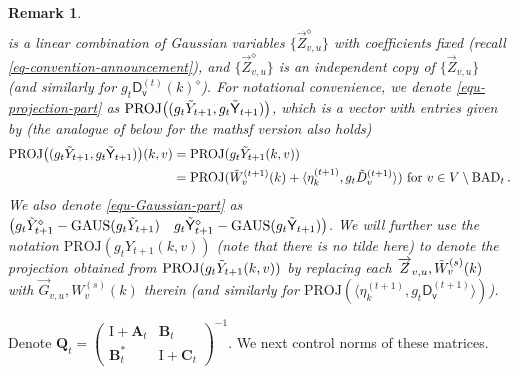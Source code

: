 \documentclass[11pt]{article}
\newtheorem{Remark}[Theorem]{Remark}
\numberwithin{equation}{section}
\begin{document}
\begin{Remark}
\begin{align*}
\end{align*}
is a linear combination of Gaussian variables $\{\overrightarrow{Z}_{v,u}^{\diamond}\}$ with coefficients fixed  (recall \eqref{eq-convention-announcement}), and $\{\overrightarrow{Z}_{v,u}^{\diamond}\}$ is an independent copy of $\{\overrightarrow{Z}_{v,u}\}$ (and similarly for $g_t \mathsf{D}^{(t)}_{\mathsf v}(k)^{ \diamond }$). For notational convenience, we denote \eqref{equ-projection-part} as $\textup{PROJ} \big( ( g_t \Tilde{Y}_{t+1} , g_t \Tilde{\mathsf{Y}}_{t+1} ) \big)$, which is a vector with entries given by  (the analogue of below for the mathsf version also holds)
\begin{align*}
    \textup{PROJ} \big( ( g_t \Tilde{Y}_{t+1} , g_t \Tilde{\mathsf{Y}}_{t+1} ) \big) (k,v) &= \mathrm{PROJ}(g_t \Tilde{Y}_{t+1}(k,v))\\
    & = \textup{PROJ}( \Tilde{W}^{(t+1)}_v(k) + \langle \eta^{(t+1)}_k, g_t\Tilde{D}^{(t+1)}_v \rangle) \mbox{ for } v\in V \setminus \mathrm{BAD}_t\,.
\end{align*}
We also denote \eqref{equ-Gaussian-part} as $\begin{pmatrix} g_t \Tilde{Y}_{t+1}^{\diamond} - \mathrm{GAUS}(g_t \Tilde{Y}_{t+1}) & g_t \Tilde{\mathsf{Y}}_{t+1}^{\diamond} - \mathrm{GAUS}(g_t \Tilde{\mathsf{Y}}_{t+1}) \end{pmatrix}$. We will further use the notation $\mathrm{PROJ}(g_t Y_{t+1}(k,v))$ (note that there is no tilde here) to denote the projection obtained from $\mathrm{PROJ}(g_t \Tilde{Y}_{t+1}(k,v))$ by replacing each $\overrightarrow{Z}_{v,u}, \Tilde{W}^{(s)}_v(k)$ with $\overrightarrow{G}_{v,u}, W^{(s)}_v(k)$ therein (and similarly for $\mathrm{PROJ}(\langle \eta^{(t+1)}_k, g_t \mathsf{D}^{(t+1)}_{\mathsf{v}} \rangle)$).
\end{Remark}

Denote $ \mathbf{Q}_t = \begin{pmatrix} \mathrm{I} + \mathbf{A}_t & \mathbf{B}_t \\ \mathbf{B}_t^{*} & \mathrm{I} + \mathbf{C}_t \end{pmatrix}^{-1}$. We next control norms of these matrices.
\end{document}
